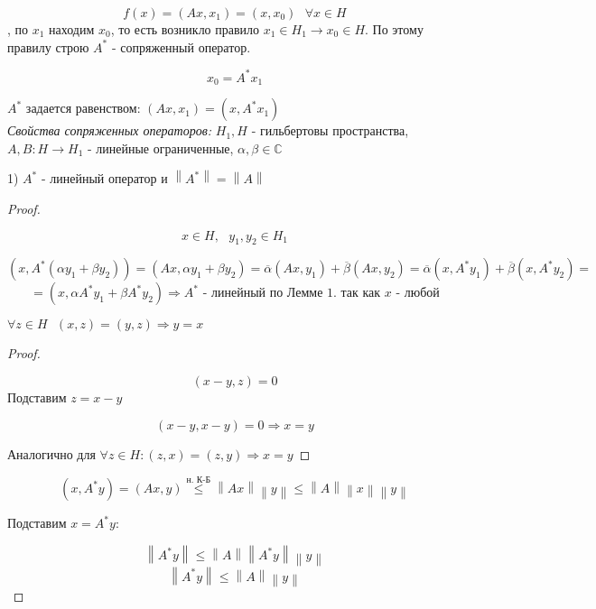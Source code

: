 \documentclass[12pt, a4paper]{report}
\begin{document}
\[ f(x )  = (A x , x_1 ) = (x, x_0 ) \text{ }  \forall  x \in  H \]  
, по \( x_1  \) находим \( x_0 \), то есть возникло правило \( x_1 \in  H_1 \to  x_0 \in  H \). По этому правилу строю \( A^* \) - сопряженный оператор. 

\[ x_0 = A ^* x_1 \] 

\( A^* \) задается равенством: \( \displaystyle (A x , x_1 ) = (x , A^* x_1) \) \\

\textit{Свойства сопряженных операторов:} \( H_1, H  \)  - гильбертовы пространства, \( A,B : H \to  H_1  \) - линейные ограниченные, \( \alpha , \beta \in  \mathbb{C} \) 

1) \( A^*  \)   - линейный оператор и \( \left\lVert A ^*  \right\rVert = \left\lVert A \right\rVert \) 

\begin{proof} \(  \) 

\[ x \in  H , \text{ }  y_1 , y_2 \in  H_1  \] 

\[ (x , A ^* ( \alpha y_1 + \beta y_2 )) = (A x , \alpha y_1 + \beta y_2 ) = \overline{\alpha } (A x , y_1 ) + \overline{\beta  } (A x , y_2 ) = \overline{ \alpha } ( x , A ^* y_1 ) +  \overline{ \beta } (x , A ^* y_2 ) =        \] 
\[  = (x , \alpha A ^* y_1 + \beta A ^* y_2 ) \Rightarrow A ^* \text{ - линейный по Лемме 1. так как  }  x \text{ - любой}   \] 

\begin{lemma}
    \( \forall  z \in  H \text{ }  (x, z ) = (y ,z ) \Rightarrow y =x \) 
\end{lemma}

\begin{proof} \(  \) 
    
    \[ (x - y , z )  = 0 \] 
    Подставим \( z = x - y  \) 

    \[  ( x- y, x - y  ) = 0 \Rightarrow x =y  \] 

    Аналогично для \( \forall  z \in  H  : (z, x ) = (z, y ) \Rightarrow x = y\) 

\end{proof}

\[ ( x , A ^* y  ) = (A x , y ) \overset{\text{н. К-Б} }{\le} \left\lVert A x  \right\rVert \left\lVert y  \right\rVert \le  \left\lVert A  \right\rVert \left\lVert x  \right\rVert \left\lVert  y  \right\rVert \]  

Подставим \( x = A ^* y  \): 

\[ \left\lVert A ^* y  \right\rVert \le  \left\lVert A  \right\rVert \left\lVert  A ^* y  \right\rVert \left\lVert y  \right\rVert  \] 
\[ \left\lVert A ^ * y  \right\rVert \le  \left\lVert A  \right\rVert \left\lVert  y \right\rVert \] 


\end{proof}
\end{document}
